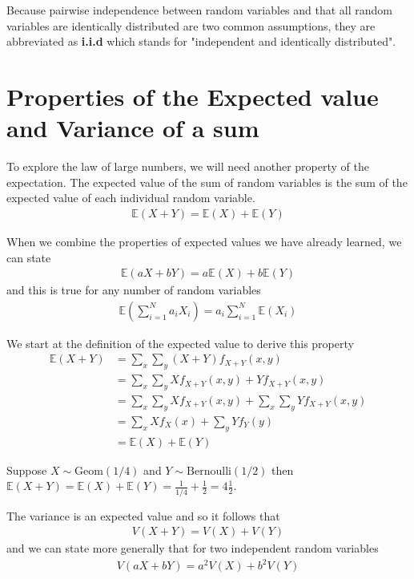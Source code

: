 Because pairwise independence between random variables and that all random variables are identically distributed are two common assumptions, they are abbreviated as \textbf{i.i.d} which stands for "independent and identically distributed".

\section{Properties of the Expected value and Variance of a sum}

To explore the law of large numbers, we will need another property of the expectation.
The expected value of the sum of random variables is the sum of the expected value of each individual random variable. 
\begin{align}
    \mathbb{E}(X+Y) = \mathbb{E}(X) + \mathbb{E}(Y)
\end{align}

When we combine the properties of expected values we have already learned, we can state 
\begin{align}
    \mathbb{E}(aX+bY) = a \mathbb{E}(X) + b \mathbb{E}(Y)
\end{align}
and this is true for any number of random variables
\begin{align}
    \mathbb{E}\left( \sum_{i=1}^{N} a_{i} X_{i} \right) = a_{i} \sum_{i=1}^{N} \mathbb{E}(X_{i})
\end{align}

We start at the definition of the expected value to derive this property 
\begin{align}
    \mathbb{E}(X+Y) &= \sum_{x} \sum_{y} (X+Y) f_{X+Y}(x,y) \\ 
                    &=\sum_{x} \sum_{y} X f_{X+Y}(x,y) + Y f_{X+Y}(x,y) \\
                    &= \sum_{x} \sum_{y} X f_{X+Y}(x,y) +  \sum_{x} \sum_{y} Y f_{X+Y}(x,y) \\
                    &= \sum_{x} X f_{X}(x) + \sum_{y} Y f_{Y}(y) \\
                    &= \mathbb{E}(X) + \mathbb{E}(Y)
\end{align}

\ex Suppose $X \sim \text{Geom}(1/4)$ and $Y \sim \text{Bernoulli}(1/2)$ then $\mathbb{E}(X+Y) = \mathbb{E}(X) + \mathbb{E}(Y) = \frac{1}{1/4} + \frac{1}{2} = 4 \frac{1}{2}$. 

The variance is an expected value and so it follows that 
\begin{align}
    V(X+Y) = V(X) + V(Y)
\end{align}
and we can state more generally that for two independent random variables 
\begin{align}
    V(aX+bY) = a^{2}V(X) + b^{2}V(Y)
\end{align}

